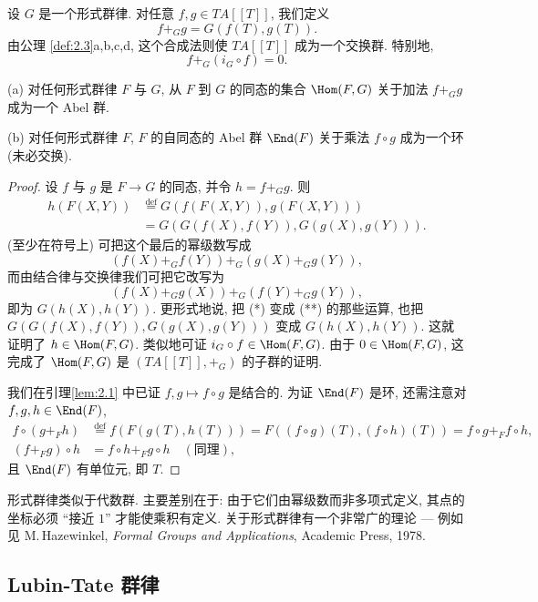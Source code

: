 设 $G$ 是一个形式群律. 对任意 $f,g\in TA[[T]]$, 我们定义
\[
f+_G g=G(f(T),g(T)).
\]
由公理 \ref{def:2.3}a,b,c,d, 这个合成法则使 $TA[[T]]$ 成为一个交换群. 特别地,
\[
f+_G(i_G\circ f)=0.
\]

\begin{lemma}\label{lem:2.8}
(a) 对任何形式群律 $F$ 与 $G$, 从 $F$ 到 $G$ 的同态的集合 $\Hom(F,G)$ 关于加法 $f+_G g$ 成为一个 Abel 群.

(b) 对任何形式群律 $F$, $F$ 的自同态的 Abel 群 $\End(F)$ 关于乘法 $f\circ g$ 成为一个环 (未必交换).
\end{lemma}

\begin{proof}
设 $f$ 与 $g$ 是 $F\to G$ 的同态, 并令 $h=f+_G g$. 则
\[
\begin{aligned}
h(F(X,Y))&\stackrel{\mathrm{def}}{=}G(f(F(X,Y)),g(F(X,Y)))\\
&=G(G(f(X),f(Y)),G(g(X),g(Y))).
\end{aligned}
\]
(至少在符号上) 可把这个最后的幂级数写成
\begin{equation*}
(f(X)+_G f(Y))+_G(g(X)+_G g(Y)),\tag{$*$}
\end{equation*}
而由结合律与交换律我们可把它改写为
\begin{equation*}
(f(X)+_G g(X))+_G(f(Y)+_G g(Y)),\tag{$**$}
\end{equation*}
即为 $G(h(X),h(Y))$. 更形式地说, 把 (*) 变成 (**) 的那些运算, 也把 $G(G(f(X),f(Y)),G(g(X),g(Y)))$ 变成 $G(h(X),h(Y))$. 这就证明了 $h\in\Hom(F,G)$. 类似地可证 $i_G\circ f\in\Hom(F,G)$. 由于 $0\in\Hom(F,G)$, 这完成了 $\Hom(F,G)$ 是 $(TA[[T]],+_G)$ 的子群的证明.

我们在引理\ref{lem:2.1} 中已证 $f,g\mapsto f\circ g$ 是结合的. 为证 $\End(F)$ 是环, 还需注意对 $f,g,h\in\End(F)$,
\[
\begin{aligned}
f\circ(g+_F h)&\stackrel{\mathrm{def}}{=}f(F(g(T),h(T)))=F((f\circ g)(T),(f\circ h)(T))=f\circ g+_F f\circ h,\\
(f+_F g)\circ h&=f\circ h+_F g\circ h\quad(\text{同理}),
\end{aligned}
\]
且 $\End(F)$ 有单位元, 即 $T$.
\end{proof}

形式群律类似于代数群. 主要差别在于: 由于它们由幂级数而非多项式定义, 其点的坐标必须 “接近 $1$” 才能使乘积有定义. 关于形式群律有一个非常广的理论 — 例如见 M.\,Hazewinkel, \emph{Formal Groups and Applications}, Academic Press, 1978.

\subsection*{Lubin-Tate 群律}

